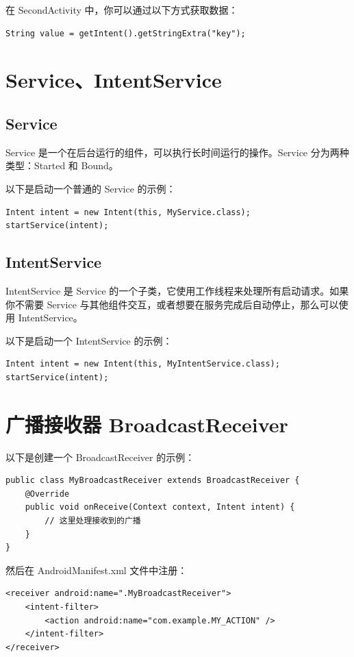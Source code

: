 \documentclass[12pt, a4paper, oneside]{ctexbook}
\numberwithin{figure}{section}
\begin{document}
在 SecondActivity 中，你可以通过以下方式获取数据：

\begin{verbatim}
String value = getIntent().getStringExtra("key");
\end{verbatim}

\section{Service、IntentService}
\subsection{Service}
Service 是一个在后台运行的组件，可以执行长时间运行的操作。Service 分为两种类型：Started 和 Bound。

以下是启动一个普通的 Service 的示例：
\begin{verbatim}
Intent intent = new Intent(this, MyService.class);
startService(intent);

\end{verbatim}

\subsection{IntentService}
IntentService 是 Service 的一个子类，它使用工作线程来处理所有启动请求。如果你不需要 Service 与其他组件交互，或者想要在服务完成后自动停止，那么可以使用 IntentService。

以下是启动一个 IntentService 的示例：

\begin{verbatim}
Intent intent = new Intent(this, MyIntentService.class);
startService(intent);

\end{verbatim}

\section{广播接收器 BroadcastReceiver}

以下是创建一个 BroadcastReceiver 的示例：
\begin{verbatim}
public class MyBroadcastReceiver extends BroadcastReceiver {
    @Override
    public void onReceive(Context context, Intent intent) {
        // 这里处理接收到的广播
    }
}

\end{verbatim}
然后在 AndroidManifest.xml 文件中注册：
\begin{verbatim}
<receiver android:name=".MyBroadcastReceiver">
    <intent-filter>
        <action android:name="com.example.MY_ACTION" />
    </intent-filter>
</receiver>

\end{verbatim}
\end{document}
